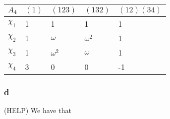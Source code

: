\documentclass[]{article}
\begin{document}
\begin{table}[h!]
	\centering
	\begin{tabular}{|l|l|l|l|l|}
		\hline
		$A_4$    & $(1)$ & $(123)$    & $(132)$    & $(12)(34)$ \\ \hline
		$\chi_1$ & 1     & 1          & 1          & 1          \\ \hline
		$\chi_2$ & 1     & $\omega$   & $\omega^2$ & 1          \\ \hline
		$\chi_3$ & 1     & $\omega^2$ & $\omega$   & 1          \\ \hline
		$\chi_4$ & 3     & 0          & 0          & -1         \\ \hline
	\end{tabular}
\end{table}
\subsubsection*{d} (HELP)
We have that 
\end{document}
